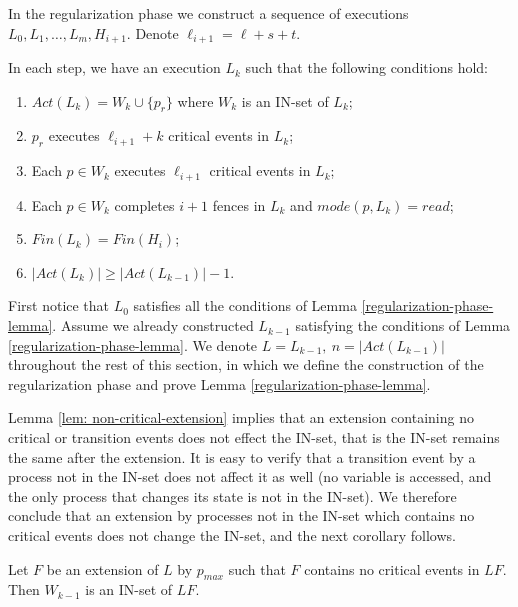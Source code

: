 








\newpage
In the regularization phase we construct a sequence of executions $L_0,L_1, \ldots, L_m, H_{i+1}$. Denote $\ell_{i+1} = \ell+s+t$.

\begin{lemma} \label{regularization-phase-lemma}
	In each step, we have an execution $L_k$ such that the following conditions hold:
	\begin{enumerate}[(1)]
		\item $Act(L_k) = W_k \cup \{p_r\}$ where $W_k$ is an IN-set of $L_k$;
		\item $p_r$ executes $\ell_{i+1}+k$ critical events in $L_k$;
		\item Each $p \in W_k$ executes $\ell_{i+1}$ critical events in $L_k$;
		\item Each $p \in W_k$ completes $i+1$ fences in $L_k$ and $mode(p,L_k) = read$;
		\item $Fin(L_k) = Fin(H_i)$;
		\item $|Act(L_k)| \geq |Act(L_{k-1})|-1$.
	\end{enumerate}
\end{lemma}

First notice that $L_0$ satisfies all the conditions of Lemma \ref{regularization-phase-lemma}. Assume we already constructed $L_{k-1}$ satisfying the conditions of Lemma \ref{regularization-phase-lemma}. We denote $L=L_{k-1},\ n=|Act(L_{k-1})|$ throughout the rest of this section, in which we define the construction of the regularization phase and prove Lemma \ref{regularization-phase-lemma}.

Lemma \ref{lem: non-critical-extension} implies that an extension containing no critical or transition events does not effect the IN-set, that is the IN-set remains the same after the extension. It is easy to verify that a transition event by a process not in the IN-set does not affect it as well (no variable is accessed, and the only process that changes its state is not in the IN-set). We therefore conclude that an extension by processes not in the IN-set which contains no critical events does not change the IN-set, and the next corollary follows.
\begin{corollary} \label{claim: q-extension}
	Let $F$ be an extension of $L$ by $p_{max}$ such that $F$ contains no critical events in $L F$. Then $W_{k-1}$ is an IN-set of $L F$.
\end{corollary}

